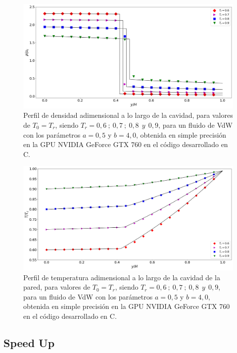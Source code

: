 \begin{figure}[h!]
	\centering
	\includegraphics[width=\textwidth]{figs/cap4/v_760_VdW_c_simple_rho_y}
	\caption{Perfil de densidad adimensional a lo largo de la cavidad, para valores de $T_0 = T_r$, siendo $T_r = 0,6\> ;\> 0,7\> ;\> 0,8\>\> y\>\> 0,9$, para un fluido de VdW con los parámetros $a = 0,5 $ y $b = 4,0 $, obtenida en simple precisión en la GPU NVIDIA GeForce GTX 760 en el código desarrollado en \textsc{C}.}
	\label{fig:v_760_VdW_c_simple_rho_y}	
\end{figure}

\begin{figure}[h!]
	\centering
	\includegraphics[width=\textwidth]{figs/cap4/v_760_VdW_c_simple_T_y}
	\caption{Perfil de temperatura adimensional a lo largo de la cavidad de la pared, para valores de $T_0 = T_r$, siendo $T_r = 0,6\> ;\> 0,7\> ;\> 0,8\>\> y\>\> 0,9$, para un fluido de VdW con los parámetros $a = 0,5 $ y $b = 4,0 $, obtenida en simple precisión en la GPU NVIDIA GeForce GTX 760 en el código desarrollado en \textsc{C}.}
	\label{fig:v_760_VdW_c_simple_T_y}	
\end{figure}

\newpage

\subsection{Speed Up}

